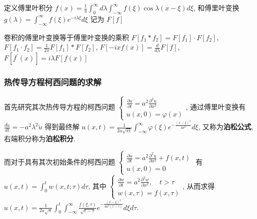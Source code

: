 \documentclass[10pt]{yerbaformat}
\begin{document}
\par 定义傅里叶积分 $f(x)=\frac{1}{\pi} \int_{0}^{\infty} d \lambda \int_{-\infty}^{\infty} f(\xi) \cos \lambda(x-\xi) d \xi$, 和傅里叶变换 $g(\lambda)=\int_{-\infty}^{\infty} f(\xi) e^{-i \lambda \xi} d \xi$ 记为 $F[f]$

\begin{lemma}
    卷积的傅里叶变换等于傅里叶变换的乘积 $F\left[f_{1} * f_{2}\right]=F\left[f_{1}\right] \cdot F\left[f_{2}\right]$, $F\left[f_{1} \cdot f_{2}\right]=\frac{1}{2 \pi} F\left[f_{1}\right] * F\left[f_{2}\right]$, $F[-i x f(x)]=\frac{d}{d \lambda} F[f]$, $F\left[f^{\prime}(x)\right]=i \lambda F[f(x)]$
\end{lemma}

\subsubsection{热传导方程柯西问题的求解}

\par 首先研究其次热传导方程的柯西问题 $\left\{\begin{array}{l}\frac{\partial u}{\partial t}=a^{2} \frac{\partial^{2} u}{\partial x^{2}} \\ u(x, 0)=\varphi(x)\end{array}\right.$, 通过傅里叶变换有 $\frac{d \tilde{u}}{d t}=-a^{2} \lambda^{2} \tilde{u}$ 得到最终解 $u(x, t)=\frac{1}{2 a \sqrt{\pi t}} \int_{-\infty}^{\infty} \varphi(\xi) e^{-\frac{(x-\xi)^{2}}{4 a^{2}}} d \xi$, 又称为\textbf{泊松公式}, 右端积分称为\textbf{泊松积分}.

\par 而对于具有其次初始条件的柯西问题 $\left\{\begin{array}{l}\frac{\partial u}{\partial t}=a^{2} \frac{\partial^{2} u}{\partial x^{2}}+f(x, t) \\ u(x, 0)=0\end{array}\right.$ 有 $u(x, t)=\int_{0}^{t} w(x, t ; \tau) d \tau$, 其中 $\left\{\begin{array}{l}\frac{\partial w}{\partial t}=a^{2} \frac{\partial^{2} w}{\partial x^{2}}, \quad t>\tau \\ w(x, \tau)=f(x, \tau)\end{array}\right.$, 从而求得 $u(x, t)=\frac{1}{2 a \sqrt{\pi}} \int_{0}^{t} \int_{-\infty}^{\infty} \frac{f(\xi, \tau)}{\sqrt{t-\tau}} e^{-\frac{(x-\xi)^{2}}{4 a^{2}(t-\tau)}} d \xi d \tau$.

\end{document}
